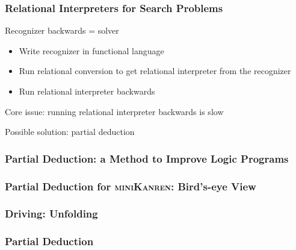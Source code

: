\documentclass[xcolor=table]{beamer}
\newcommand{\mk}{\textsc{miniKanren}\xspace}
\begin{document}
\begin{frame}[fragile]
  \frametitle{Relational Interpreters for Search Problems}
  \begin{center}
    Recognizer backwards = solver
  \end{center}

  \begin{itemize}
    \item Write recognizer in functional language
    \item Run relational conversion to get relational interpreter from the recognizer
    \item Run relational interpreter backwards
  \end{itemize}

\begin{center}
  Core issue: running relational interpreter backwards is slow
\end{center}

\begin{center}
  Possible solution: partial deduction
\end{center}
\end{frame}


\begin{frame}[fragile]
  \frametitle{Partial Deduction: a Method to Improve Logic Programs}
\begin{center}
  
\end{center}
\end{frame}

\begin{frame}[fragile]
  \frametitle{Partial Deduction for \mk: Bird's-eye View}
  \begin{center}

  \end{center}
\end{frame}

\begin{frame}[fragile]
  \frametitle{Driving: Unfolding}
  \begin{center}
    
  \end{center}
\end{frame}

\begin{frame}[fragile]
  \frametitle{Partial Deduction}

\begin{center}
  
\end{center}

\end{frame}
\end{document}
